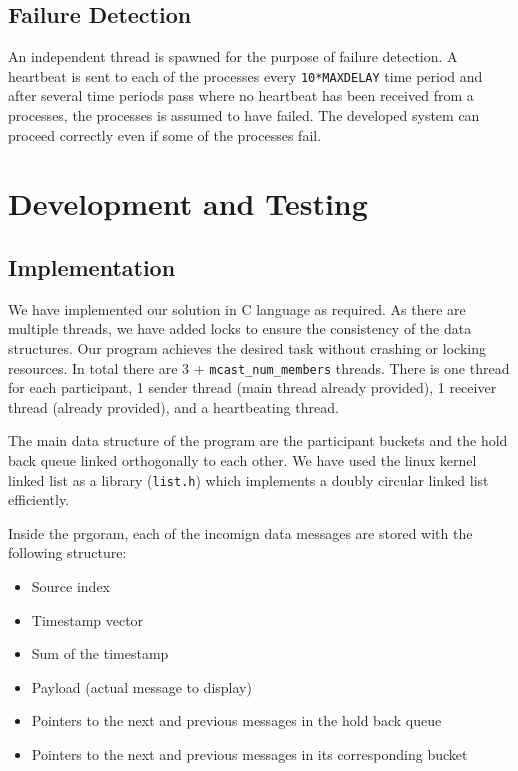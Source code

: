 \documentclass[11pt]{report}
\begin{document}

		

	
	\section{Failure Detection}	
		An independent thread is spawned for the purpose of failure detection.  A heartbeat is sent to each of the processes every \verb+10*MAXDELAY+ time period and after several time periods pass where no heartbeat has been received from a processes, the processes is assumed to have failed.  The developed system can proceed correctly even if some of the processes fail. 

\chapter{Development and Testing}
	
\section{Implementation}

	We have implemented our solution in C language as required. As there are multiple threads, we have added locks to ensure the consistency of the data structures. Our program achieves the desired task without crashing or locking resources. In total there are 3 + \verb+mcast_num_members+ threads. There is one thread for each participant, 1 sender thread (main thread already provided), 1 receiver thread (already provided), and a heartbeating thread. 

The main data structure of the program are the participant buckets and the hold back queue linked orthogonally to each other. We have used the linux kernel linked list as a library (\verb+list.h+) which implements a doubly circular linked list efficiently. 

Inside the prgoram, each of the incomign data messages are stored with the following structure:

\begin{itemize}
    \item Source index
    \item  Timestamp vector
    \item Sum of the timestamp 
    \item Payload (actual message to display)
    \item Pointers to the next and previous messages in the hold back queue
	\item Pointers to the next and previous messages in its corresponding bucket
\end{itemize}
\end{document}
